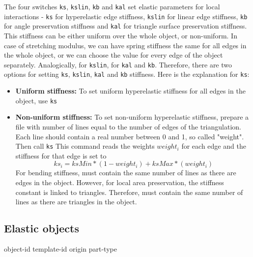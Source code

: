 The four switches \verb|ks|, \verb|kslin|, \verb|kb| and \verb|kal| set elastic parameters for local interactions - \verb|ks| for hyperelastic edge stiffness, \verb|kslin| for linear edge stiffness, \verb|kb| for angle preservation stiffness and \verb|kal| for triangle surface preservation stiffness. This stiffness can be either uniform over the whole object, or non-uniform. In case of stretching modulus, we can have spring stiffness the same for all edges in the whole object, or we can choose the value for every edge of the object separately. Analogically, for \verb|kslin|, for \verb|kal| and \verb|kb|. Therefore, there are two options for setting \verb|ks|, \verb|kslin|, \verb|kal| and \verb|kb| stiffness. Here is the explanation for \verb|ks|:
\begin{itemize}
\item {\bf Uniform stiffness:} To set uniform hyperelastic stiffness for all edges in the object, use \verb|ks| 
\item {\bf Non-uniform stiffness:} To set non-uniform hyperelastic stiffness, prepare a file  with number of lines equal to the number of edges of the triangulation. Each line should contain a real number between 0 and 1, so called "weight". Then call
\verb|ks|   
This command reads the weights $weight_i$ for each edge and the stiffness for that edge is set to 
$$
ks_i = ksMin * (1 - weight_i) + ksMax*(weight_i)
$$
For bending stiffness,  must contain the same number of lines as there are edges in the object. However, for local area preservation, the stiffness constant is linked to triangles. Therefore,  must contain the same number of lines as there are triangles in the object.
\end{itemize}


\subsection{\label{ssec:oif-add-object}Elastic objects}

\begin{essyntax}
  object-id  
  template-id  
  origin   
  part-type 
  \begin{features}
  \end{features}
\end{essyntax}

